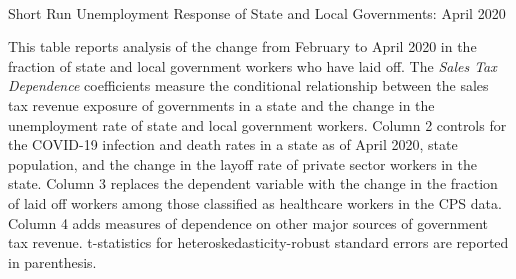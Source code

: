 \begin{landscape}
\begin{table}[!ht]
\begin{center}
\begin{threeparttable}

\caption{\\ Short Run Unemployment Response of State and Local Governments: April 2020}
\label{table:muniLaidoffCovidDiff}

\centering 

\begin{small}

	

\end{small}

\begin{footnotesize}
\begin{tablenotes}
\item This table reports analysis of the change from February to April 2020 in the fraction of state and local government workers who have laid off. The \emph{Sales Tax Dependence} coefficients measure the conditional relationship between the sales tax revenue exposure of governments in a state and the change in the unemployment rate of state and local government workers. Column 2 controls for the COVID-19 infection and death rates in a state as of April 2020, state population, and the change in the layoff rate of private sector workers in the state. Column 3 replaces the dependent variable with the change in the fraction of laid off workers among those classified as healthcare workers in the CPS data. Column 4 adds measures of dependence on other major sources of government tax revenue.   t-statistics for heteroskedasticity-robust standard errors are reported in parenthesis. 

\end{tablenotes}
\end{footnotesize}
\end{threeparttable}
\end{center}
\end{table}
\thispagestyle{empty}
\end{landscape}




